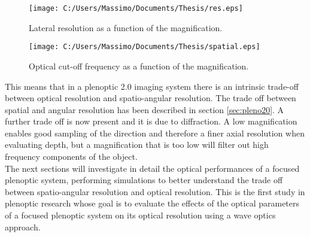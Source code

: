 \begin{figure}[H]
	\centering
	\texttt{[image: C:/Users/Massimo/Documents/Thesis/res.eps]}
	\caption{\label{fig:lateral} Lateral resolution as a function of the magnification.}
\end{figure}
\begin{figure}[H]
	\centering
	\texttt{[image: C:/Users/Massimo/Documents/Thesis/spatial.eps]}
	\caption{\label{fig:freq} Optical cut-off frequency as a function of the magnification.}
\end{figure}
This means that in a plenoptic 2.0 imaging system there is an intrinsic trade-off between optical resolution and spatio-angular resolution. The trade off between spatial and angular resolution has been described in section \ref{sec:pleno20}. A further trade off is now present and it is due to diffraction. A low magnification enables good sampling of the direction and therefore a finer axial resolution when evaluating depth, but a magnification that is too low will filter out high frequency components of the object. \\
The next sections will investigate in detail the optical performances of a focused plenoptic system, performing simulations to better understand the trade off between spatio-angular resolution and optical resolution. This is the first study in plenoptic research whose goal is to evaluate the effects of the optical parameters of a focused plenoptic system on its optical resolution using a wave optics approach.
